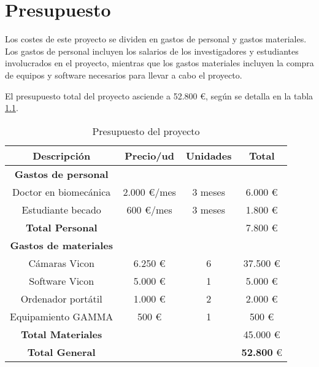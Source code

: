 \chapter{Presupuesto} \label{sec:cap4}

\noindent Los costes de este proyecto se dividen en gastos de personal y gastos materiales. Los gastos de personal incluyen los salarios de los investigadores y estudiantes involucrados en el proyecto, mientras que los gastos materiales incluyen la compra de equipos y software necesarios para llevar a cabo el proyecto.

El presupuesto total del proyecto asciende a 52.800 €, según se detalla en la tabla \ref{tab:presupuesto}.

\begin{table}[H]
    \centering
    \caption{Presupuesto del proyecto}
    \begin{tabular}{cccc}
    \toprule
    {\textbf{Descripción}} & {\textbf{Precio/ud}} & {\textbf{Unidades}} & {\textbf{Total}} \\
    \midrule
    \textbf{Gastos de personal} & & & \\
    Doctor en biomecánica & 2.000 €/mes & 3 meses & 6.000 € \\
    Estudiante becado & 600 €/mes & 3 meses & 1.800 € \\
    \hline
    \textbf{Total Personal} & & & 7.800 € \\
    \hline
    \textbf{Gastos de materiales} & & & \\
    Cámaras Vicon & 6.250 € & 6 & 37.500 € \\
    Software Vicon & 5.000 € & 1 & 5.000 € \\
    Ordenador portátil & 1.000 € & 2 & 2.000 € \\
    Equipamiento \ac{GAMMA} & 500 € & 1 & 500 € \\
    \hline
    \textbf{Total Materiales} & & & 45.000 € \\
    \hline
    \textbf{Total General} & & & \textbf{52.800} € \\
    \bottomrule
    \end{tabular}
    \label{tab:presupuesto}
  \end{table}
